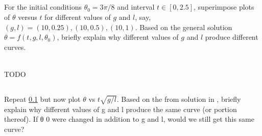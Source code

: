 \documentclass[12pt]{article}
\begin{document}
\subsection{}
\label{sec:minilab-part-1}
\begin{Ex}
  For the initial conditions $\theta_0=3\pi/8$ and interval $t\in[0,2.5]$,
  superimpose plots of $\theta$ versus $t$ for different values of $g$ and $l$,
  say, $(g,l)=(10, 0.25), (10, 0.5), (10, 1)$. Based on the general solution
  $\theta = f(t,g,l,\theta_0)$, briefly explain why different values of $g$ and
  $l$ produce different curves.
  \begin{solution} \hfill \vspace{.75em} \\
    {\huge \color{red}TODO}
  \end{solution}
\end{Ex}

\subsection{}
Repeat \cref{sec:minilab-part-1} but now plot $\theta$ vs $t\sqrt{g/l}$. Based
on the from solution in , briefly
explain why different values of g and l produce the same curve (or portion thereof). If θ 0 were
changed in addition to g and l, would we still get this same curve?
\end{document}
